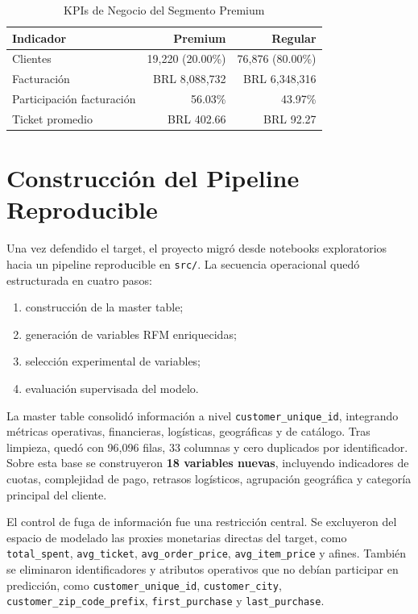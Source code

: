 \documentclass[journal,letterpaper]{IEEEtran}
\begin{document}
\begin{table}[h]
\centering
\caption{KPIs de Negocio del Segmento Premium}
\label{tab:kpis_final}
\begin{tabular}{lrr}
\toprule
Indicador & Premium & Regular \\
\midrule
Clientes & 19,220 (20.00\%) & 76,876 (80.00\%) \\
Facturación & BRL 8,088,732 & BRL 6,348,316 \\
Participación facturación & 56.03\% & 43.97\% \\
Ticket promedio & BRL 402.66 & BRL 92.27 \\
\bottomrule
\end{tabular}
\end{table}

\section{Construcción del Pipeline Reproducible}
Una vez defendido el target, el proyecto migró desde notebooks exploratorios hacia un pipeline reproducible en \texttt{src/}. La secuencia operacional quedó estructurada en cuatro pasos:
\begin{enumerate}
    \item construcción de la master table;
    \item generación de variables RFM enriquecidas;
    \item selección experimental de variables;
    \item evaluación supervisada del modelo.
\end{enumerate}

La master table consolidó información a nivel \texttt{customer\_unique\_id}, integrando métricas operativas, financieras, logísticas, geográficas y de catálogo. Tras limpieza, quedó con 96,096 filas, 33 columnas y cero duplicados por identificador. Sobre esta base se construyeron \textbf{18 variables nuevas}, incluyendo indicadores de cuotas, complejidad de pago, retrasos logísticos, agrupación geográfica y categoría principal del cliente.

El control de fuga de información fue una restricción central. Se excluyeron del espacio de modelado las proxies monetarias directas del target, como \texttt{total\_spent}, \texttt{avg\_ticket}, \texttt{avg\_order\_price}, \texttt{avg\_item\_price} y afines. También se eliminaron identificadores y atributos operativos que no debían participar en predicción, como \texttt{customer\_unique\_id}, \texttt{customer\_city}, \texttt{customer\_zip\_code\_prefix}, \texttt{first\_purchase} y \texttt{last\_purchase}.
\end{document}
